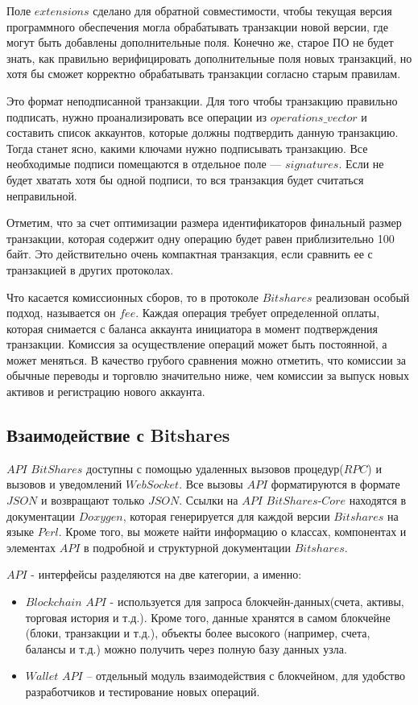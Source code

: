 \documentclass[a4paper, 14pt]{extarticle}
\begin{document}
Поле $extensions$ сделано для обратной совместимости, чтобы текущая версия программного обеспечения могла обрабатывать транзакции новой версии, где могут быть добавлены дополнительные поля. Конечно же, старое ПО не будет знать, как правильно верифицировать дополнительные поля новых транзакций, но хотя бы сможет корректно обрабатывать транзакции согласно старым правилам.

Это формат неподписанной транзакции. Для того чтобы транзакцию правильно подписать, нужно проанализировать все операции из $operations\_vector$ и составить список аккаунтов, которые должны подтвердить данную транзакцию. Тогда станет ясно, какими ключами нужно подписывать транзакцию. Все необходимые подписи помещаются в отдельное поле — $signatures$. Если не будет хватать хотя бы одной подписи, то вся транзакция будет считаться неправильной.

Отметим, что за счет оптимизации размера идентификаторов финальный размер транзакции, которая содержит одну операцию будет равен приблизительно 100 байт. Это действительно очень компактная транзакция, если сравнить ее с транзакцией в других протоколах.

Что касается комиссионных сборов, то в протоколе $Bitshares$ реализован особый подход, называется он $fee$. Каждая операция требует определенной оплаты, которая снимается с баланса аккаунта инициатора в момент подтверждения транзакции. Комиссия за осуществление операций может быть постоянной, а может меняться. В качество грубого сравнения можно отметить, что комиссии за обычные переводы и торговлю значительно ниже, чем комиссии за выпуск новых активов и регистрацию нового аккаунта.

\subsection{Взаимодействие с Bitshares}
$API$ $BitShares$ доступны с помощью удаленных вызовов процедур($RPC$) и вызовов и уведомлений $WebSocket$. Все вызовы $API$ форматируются в формате $JSON$ и возвращают только $JSON$. Ссылки на $API$ $BitShares$-$Core$ находятся в документации $Doxygen$, которая генерируется для каждой версии $Bitshares$ на языке $Perl$. Кроме того, вы можете найти информацию о классах, компонентах и элементах $API$ в подробной и структурной документации $Bitshares$.

$API$ - интерфейсы разделяются на две категории, а именно:

\begin{itemize}
    \item $Blockchain$ $API$ - используется для запроса блокчейн-данных(счета, активы, торговая история и т.д.). Кроме того, данные хранятся в самом блокчейне (блоки, транзакции и т.д.), объекты более высокого  (например, счета, балансы и т.д.) можно получить через полную базу данных узла.
    \item $Wallet$ $API$ – отдельный модуль взаимодействия с блокчейном, для удобство разработчиков и тестирование новых операций.
\end{itemize}
\end{document}
